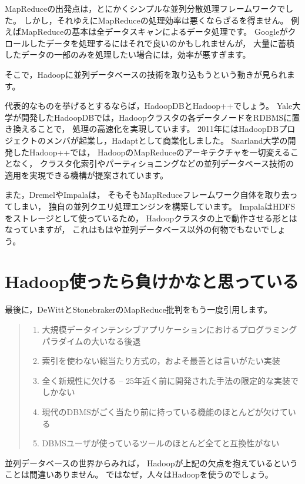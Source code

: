 MapReduceの出発点は，とにかくシンプルな並列分散処理フレームワークでした。
しかし，それゆえにMapReduceの処理効率は悪くならざるを得ません。
例えばMapReduceの基本は全データスキャンによるデータ処理です。
Googleがクロールしたデータを処理するにはそれで良いのかもしれませんが，
大量に蓄積したデータの一部のみを処理したい場合には，効率が悪すぎます。

そこで，Hadoopに並列データベースの技術を取り込もうという動きが見られます。

代表的なものを挙げるとするならば，HadoopDBとHadoop++でしょう。
Yale大学が開発したHadoopDBでは，Hadoopクラスタの各データノードをRDBMSに置き換えることで，
処理の高速化を実現しています。
2011年にはHadoopDBプロジェクトのメンバが起業し，Hadaptとして商業化しました。
Saarland大学の開発したHadoop++では，
HadoopのMapReduceのアーキテクチャを一切変えることなく，
クラスタ化索引やパーティショニングなどの並列データベース技術の適用を実現できる機構が提案されています。

また，DremelやImpalaは，
そもそもMapReduceフレームワーク自体を取り去ってしまい，
独自の並列クエリ処理エンジンを構築しています。
ImpalaはHDFSをストレージとして使っているため，
Hadoopクラスタの上で動作させる形とはなっていますが，
これはもはや並列データベース以外の何物でもないでしょう。

\section{Hadoop使ったら負けかなと思っている}

最後に，DeWittとStonebrakerのMapReduce批判をもう一度引用します。

\begin{quote}
\begin{enumerate}
 \item 大規模データインテンシブアプリケーションにおけるプログラミングパラダイムの大いなる後退
 \item 索引を使わない総当たり方式の，およそ最善とは言いがたい実装
 \item 全く新規性に欠ける -- 25年近く前に開発された手法の限定的な実装でしかない
 \item 現代のDBMSがごく当たり前に持っている機能のほとんどが欠けている
 \item DBMSユーザが使っているツールのほとんど全てと互換性がない
\end{enumerate}
\end{quote}

並列データベースの世界からみれば，
Hadoopが上記の欠点を抱えているということは間違いありません。
ではなぜ，人々はHadoopを使うのでしょう。

